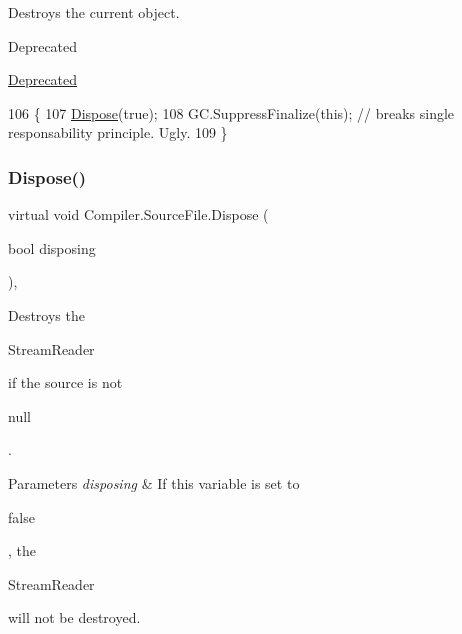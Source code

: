 Destroys the current object. \begin{DoxyRefDesc}{Deprecated}
\item[\mbox{\hyperlink{deprecated__deprecated000001}{Deprecated}}]\end{DoxyRefDesc}

\begin{DoxyCode}
106                                           \{
107                         \mbox{\hyperlink{class_compiler_1_1_source_file_af5331d15e3c1a629af9cbd273c36c02c}{Dispose}}(\textcolor{keyword}{true});
108                         GC.SuppressFinalize(\textcolor{keyword}{this}); \textcolor{comment}{// breaks single responsability principle. Ugly.}
109                     \}
\end{DoxyCode}
\mbox{\label{class_compiler_1_1_source_file_a71c994b257804a95d0f05f7347b10879}} 
\subsubsection{\texorpdfstring{Dispose()}{Dispose()}\hspace{0.1cm}{\footnotesize\ttfamily [2/2]}}
{\footnotesize\ttfamily virtual void Compiler.\+Source\+File.\+Dispose (\begin{DoxyParamCaption}\item[{bool}]{disposing }\end{DoxyParamCaption})\hspace{0.3cm}{\ttfamily [protected]}, {\ttfamily [virtual]}}

Destroys the
\begin{DoxyCode}
StreamReader 
\end{DoxyCode}
 if the source is not
\begin{DoxyCode}
null 
\end{DoxyCode}
 . 
\begin{DoxyParams}{Parameters}
{\em disposing} & If this variable is set to
\begin{DoxyCode}
\textcolor{keyword}{false} 
\end{DoxyCode}
 , the
\begin{DoxyCode}
StreamReader 
\end{DoxyCode}
 will not be destroyed. \\
\hline
\end{DoxyParams}

